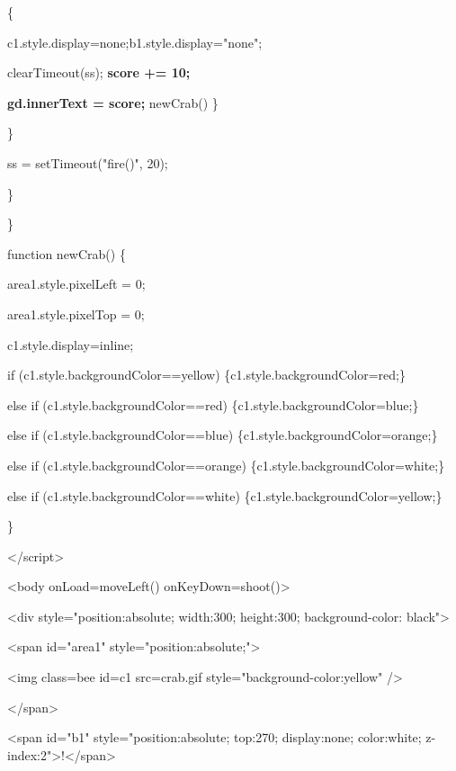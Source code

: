 \documentclass[
]{article}
\begin{document}
\{

c1.style.display=\textquotesingle none\textquotesingle;b1.style.display="none";

clearTimeout(ss); \textbf{score += 10;}

\textbf{gd.innerText = score;} newCrab() \}

\}

ss = setTimeout("fire()", 20);

\}

\}

function newCrab() \{

area1.style.pixelLeft = 0;

area1.style.pixelTop = 0;

c1.style.display=\textquotesingle inline\textquotesingle;

if (c1.style.backgroundColor==\textquotesingle yellow\textquotesingle)
\{c1.style.backgroundColor=\textquotesingle red\textquotesingle;\}

else if (c1.style.backgroundColor==\textquotesingle red\textquotesingle)
\{c1.style.backgroundColor=\textquotesingle blue\textquotesingle;\}

else if
(c1.style.backgroundColor==\textquotesingle blue\textquotesingle)
\{c1.style.backgroundColor=\textquotesingle orange\textquotesingle;\}

else if
(c1.style.backgroundColor==\textquotesingle orange\textquotesingle)
\{c1.style.backgroundColor=\textquotesingle white\textquotesingle;\}

else if
(c1.style.backgroundColor==\textquotesingle white\textquotesingle)
\{c1.style.backgroundColor=\textquotesingle yellow\textquotesingle;\}

\}

\textless/script\textgreater{}

\textless body onLoad=moveLeft() onKeyDown=shoot()\textgreater{}

\textless div style="position:absolute; width:300; height:300;
background-color: black"\textgreater{}

\textless span id="area1" style="position:absolute;"\textgreater{}

\textless img class=\textquotesingle bee\textquotesingle{} id=c1
src=\textquotesingle crab.gif\textquotesingle{}
style="background-color:yellow" /\textgreater{}

\textless/span\textgreater{}

\textless span id="b1" style="position:absolute; top:270; display:none;
color:white; z-index:2"\textgreater!\textless/span\textgreater{}
\end{document}
